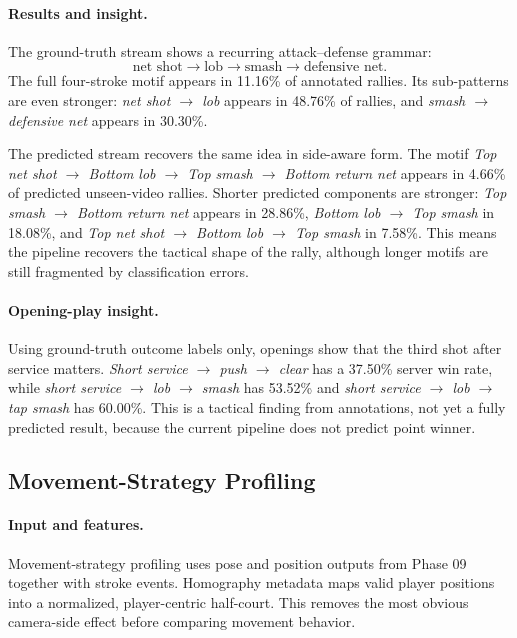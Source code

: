 \documentclass{article}
\begin{document}
\paragraph{Results and insight.}
The ground-truth stream shows a recurring attack--defense grammar:
\[
\text{net shot}\rightarrow\text{lob}\rightarrow
\text{smash}\rightarrow\text{defensive net}.
\]
The full four-stroke motif appears in 11.16\% of annotated rallies. Its
sub-patterns are even stronger: \emph{net shot $\rightarrow$ lob} appears in
48.76\% of rallies, and \emph{smash $\rightarrow$ defensive net} appears in
30.30\%.

The predicted stream recovers the same idea in side-aware form. The motif
\emph{Top net shot $\rightarrow$ Bottom lob $\rightarrow$ Top smash
$\rightarrow$ Bottom return net} appears in 4.66\% of predicted unseen-video
rallies. Shorter predicted components are stronger: \emph{Top smash
$\rightarrow$ Bottom return net} appears in 28.86\%, \emph{Bottom lob
$\rightarrow$ Top smash} in 18.08\%, and \emph{Top net shot $\rightarrow$
Bottom lob $\rightarrow$ Top smash} in 7.58\%. This means the pipeline
recovers the tactical shape of the rally, although longer motifs are still
fragmented by classification errors.

\paragraph{Opening-play insight.}
Using ground-truth outcome labels only, openings show that the third shot
after service matters. \emph{Short service $\rightarrow$ push $\rightarrow$
clear} has a 37.50\% server win rate, while \emph{short service
$\rightarrow$ lob $\rightarrow$ smash} has 53.52\% and \emph{short service
$\rightarrow$ lob $\rightarrow$ tap smash} has 60.00\%. This is a tactical
finding from annotations, not yet a fully predicted result, because the
current pipeline does not predict point winner.

\subsection{Movement-Strategy Profiling}

\paragraph{Input and features.}
Movement-strategy profiling uses pose and position outputs from Phase 09
together with stroke events. Homography metadata maps valid player positions
into a normalized, player-centric half-court. This removes the most obvious
camera-side effect before comparing movement behavior.
\end{document}
